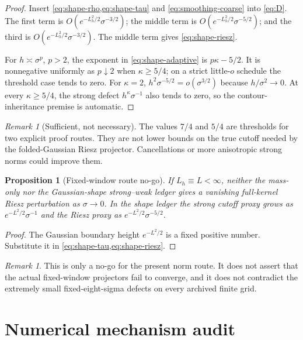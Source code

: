 \documentclass[11pt]{article}
\newtheorem{proposition}[theorem]{Proposition}
\theoremstyle{remark}
\newtheorem{remark}[theorem]{Remark}
\begin{document}
\begin{proof}
Insert \cref{eq:shape-rho,eq:shape-tau} and
\eqref{eq:smoothing-coarse} into \eqref{eq:D}.  The first term is
$O(e^{-L_h^2/2}\sigma^{-3/2})$; the middle term is
$O(e^{-L_h^2/2}\sigma^{-5/2})$; and the third is
$O(e^{-L_h^2/2}\sigma^{-3/2})$.  The middle term gives
\eqref{eq:shape-riesz}.

For $h\asymp\sigma^p$, $p>2$, the exponent in
\eqref{eq:shape-adaptive} is $p\kappa-5/2$.  It is nonnegative uniformly as
$p\downarrow2$ when $\kappa\ge5/4$; on a strict little-$o$ schedule the
threshold case tends to zero.  For $\kappa=2$,
$h^2\sigma^{-5/2}=o(\sigma^{3/2})$ because $h/\sigma^2\to0$.
At every $\kappa\ge5/4$, the strong defect
$h^\kappa\sigma^{-1}$ also tends to zero, so the contour-inheritance
premise is automatic.
\end{proof}

\begin{remark}[Sufficient, not necessary]
The values $7/4$ and $5/4$ are thresholds for two explicit proof routes.
They are not lower bounds on the true cutoff needed by the folded-Gaussian
Riesz projector.  Cancellations or more anisotropic strong norms could
improve them.
\end{remark}

\begin{proposition}[Fixed-window route no-go]
\label{prop:fixed-no-go}
If $L_h\equiv L<\infty$, neither the mass-only nor the Gaussian-shape
strong--weak ledger gives a vanishing full-kernel Riesz perturbation as
$\sigma\to0$.  In the shape ledger the strong cutoff proxy grows as
$e^{-L^2/2}\sigma^{-1}$ and the Riesz proxy as
$e^{-L^2/2}\sigma^{-5/2}$.
\end{proposition}

\begin{proof}
The Gaussian boundary height $e^{-L^2/2}$ is a fixed positive number.
Substitute it in \cref{eq:shape-tau,eq:shape-riesz}.
\end{proof}

\begin{remark}
This is only a no-go for the present norm route.  It does not assert that
the actual fixed-window projectors fail to converge, and it does not
contradict the extremely small fixed-eight-sigma defects on every archived
finite grid.
\end{remark}

\section{Numerical mechanism audit}
\end{document}
